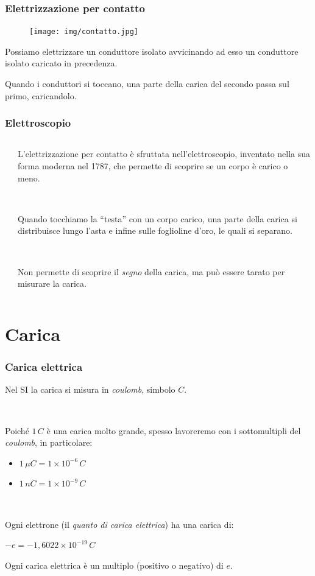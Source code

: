 \documentclass[]{beamer}
\theoremstyle{plain}
\begin{document}
\begin{frame}
\frametitle{Elettrizzazione per contatto}
\begin{figure}
\texttt{[image: img/contatto.jpg]}
\end{figure}
Possiamo elettrizzare un conduttore isolato avvicinando ad esso un conduttore isolato caricato in precedenza.

Quando i conduttori si toccano, \alert{una parte della carica del secondo passa sul primo, caricandolo}.
\end{frame}





\begin{frame}
\frametitle{Elettroscopio}
\begin{columns}
\begin{column}{0.2\textwidth}
\end{column}
\begin{column}{0.7\textwidth}
L'elettrizzazione per contatto è sfruttata nell'elettroscopio, inventato nella sua forma moderna nel 1787, che permette di scoprire se un corpo è carico o meno.\pause

~

Quando tocchiamo la ``testa'' con un corpo carico, una parte della carica si distribuisce lungo l'asta e infine sulle foglioline d'oro, le quali \alert{si separano}.\pause

~

Non permette di scoprire il \emph{segno} della carica, ma può essere tarato per misurare la carica.
\end{column}
\end{columns}
\end{frame}



\section{Carica}

\begin{frame}
\frametitle{Carica elettrica}
Nel SI \alert<1>{la carica si misura in \emph{coulomb}}, simbolo $ C $.\pause

~

Poiché $ 1 \, C $ è una carica molto grande, spesso lavoreremo con i sottomultipli del \emph{coulomb}, in particolare:
\begin{itemize}
  \item $ 1 \, \mu C = 1 \times 10^{-6} \, C $
  \item $ 1 \, n C = 1 \times 10^{-9} \, C $
\end{itemize}\pause

~

Ogni elettrone (il \emph{quanto di carica elettrica}) ha una carica di:
\begin{center}
\colorbox{marroncino!30}{$ -e = - 1,6022 \times 10^{-19} \, C $}
\end{center}

Ogni carica elettrica è un multiplo (positivo o negativo) di $ e $.
\end{frame}
\end{document}

